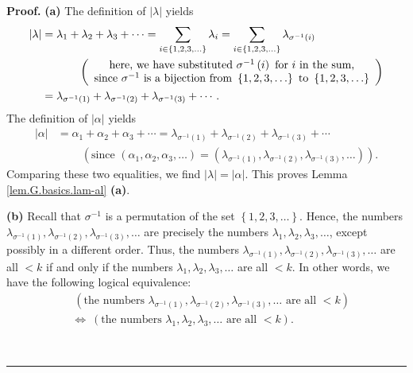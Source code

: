 \documentclass[numbers=enddot,12pt,final,onecolumn,notitlepage]{scrartcl}%
\theoremstyle{definition}
\newenvironment{proof}[1][Proof]{\noindent\textbf{#1.} }{\ \rule{0.5em}{0.5em}}
\let\sumnonlimits\sum
\renewcommand{\sum}{\sumnonlimits\limits}
\newenvironment{verlong}{}{}
\begin{document}
\begin{verlong}
\begin{proof}
\textbf{(a)} The definition of $\left\vert \lambda\right\vert $ yields
\begin{align*}
\left\vert \lambda\right\vert  &  =\lambda_{1}+\lambda_{2}+\lambda_{3}%
+\cdots=\sum_{i\in\left\{  1,2,3,\ldots\right\}  }\lambda_{i}=\sum
_{i\in\left\{  1,2,3,\ldots\right\}  }\lambda_{\sigma^{-1}\left(  i\right)
}\\
&  \ \ \ \ \ \ \ \ \ \ \left(
\begin{array}
[c]{c}%
\text{here, we have substituted }\sigma^{-1}\left(  i\right)  \text{ for
}i\text{ in the sum,}\\
\text{since }\sigma^{-1}\text{ is a bijection from }\left\{  1,2,3,\ldots
\right\}  \text{ to }\left\{  1,2,3,\ldots\right\}
\end{array}
\right) \\
&  =\lambda_{\sigma^{-1}\left(  1\right)  }+\lambda_{\sigma^{-1}\left(
2\right)  }+\lambda_{\sigma^{-1}\left(  3\right)  }+\cdots.
\end{align*}
The definition of $\left\vert \alpha\right\vert $ yields%
\begin{align*}
\left\vert \alpha\right\vert  &  =\alpha_{1}+\alpha_{2}+\alpha_{3}%
+\cdots=\lambda_{\sigma^{-1}\left(  1\right)  }+\lambda_{\sigma^{-1}\left(
2\right)  }+\lambda_{\sigma^{-1}\left(  3\right)  }+\cdots\\
&  \ \ \ \ \ \ \ \ \ \ \left(  \text{since }\left(  \alpha_{1},\alpha
_{2},\alpha_{3},\ldots\right)  =\left(  \lambda_{\sigma^{-1}\left(  1\right)
},\lambda_{\sigma^{-1}\left(  2\right)  },\lambda_{\sigma^{-1}\left(
3\right)  },\ldots\right)  \right)  .
\end{align*}
Comparing these two equalities, we find $\left\vert \lambda\right\vert
=\left\vert \alpha\right\vert $. This proves Lemma \ref{lem.G.basics.lam-al}
\textbf{(a)}.

\textbf{(b)} Recall that $\sigma^{-1}$ is a permutation of the set $\left\{
1,2,3,\ldots\right\}  $. Hence, the numbers $\lambda_{\sigma^{-1}\left(
1\right)  },\lambda_{\sigma^{-1}\left(  2\right)  },\lambda_{\sigma
^{-1}\left(  3\right)  },\ldots$ are precisely the numbers $\lambda
_{1},\lambda_{2},\lambda_{3},\ldots$, except possibly in a different order.
Thus, the numbers $\lambda_{\sigma^{-1}\left(  1\right)  },\lambda
_{\sigma^{-1}\left(  2\right)  },\lambda_{\sigma^{-1}\left(  3\right)
},\ldots$ are all $<k$ if and only if the numbers $\lambda_{1},\lambda
_{2},\lambda_{3},\ldots$ are all $<k$. In other words, we have the following
logical equivalence:%
\begin{align}
&  \ \left(  \text{the numbers }\lambda_{\sigma^{-1}\left(  1\right)
},\lambda_{\sigma^{-1}\left(  2\right)  },\lambda_{\sigma^{-1}\left(
3\right)  },\ldots\text{ are all }<k\right) \nonumber\\
&  \Longleftrightarrow\ \left(  \text{the numbers }\lambda_{1},\lambda
_{2},\lambda_{3},\ldots\text{ are all }<k\right)  .
\label{pf.lem.G.basics.lam-al.b.1}%
\end{align}



\end{proof}
\end{verlong}
\end{document}
